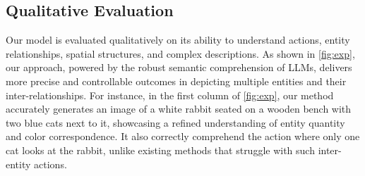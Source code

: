 \subsection{Qualitative Evaluation}


Our model is evaluated qualitatively on its ability to understand actions, entity relationships, spatial structures, and complex descriptions. As shown in \cref{fig:exp}, our approach,  powered by the robust semantic comprehension of LLMs, delivers more precise and controllable outcomes in depicting multiple entities and their inter-relationships. For instance, in the first column of \cref{fig:exp}, our method accurately generates an image of a white rabbit seated on a wooden bench with two blue cats next to it, showcasing a refined understanding of entity quantity and color correspondence. It also correctly comprehend the action where only one cat looks at the rabbit, unlike existing methods that struggle with such inter-entity actions.

